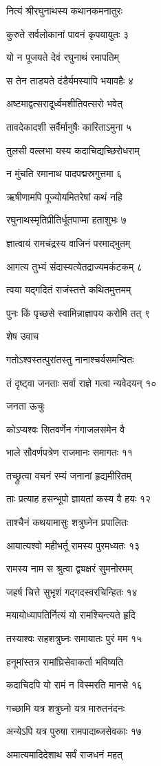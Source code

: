 नित्यं श्रीरघुनाथस्य कथानकमनातुरः

कुरुते सर्वलोकानां पावनं कृपयायुतः ३

यो न पूजयते देवं रघुनाथं रमापतिम्

स तेन ताड्यते दंडैर्यमस्यापि भयावहैः ४

अष्टमाद्वत्सरादूर्ध्वमशीतिवत्सरो भवेत्

तावदेकादशी सर्वैर्मानुषैः कारिताऽमुना ५

तुलसी वल्लभा यस्य कदाचिद्यच्छिरोधराम्

न मुंचति रमानाथ पादपद्मस्रगुत्तमा ६

ऋषीणामपि पूज्योयमितरेषां कथं नहि

रघुनाथस्मृतिप्रीतिर्धूतपाप्मा हताशुभः ७

ज्ञात्वायं रामचंद्रस्य वाजिनं परमाद्भुतम्

आगत्य तुभ्यं संदास्यत्येतद्राज्यमकंटकम् ८

त्वया यद्गदितं राजंस्तत्ते कथितमुत्तमम्

पुनः किं पृच्छसे स्वामिन्नाज्ञापय करोमि तत् ९

शेष उवाच

गतोऽश्वस्तत्पुरांतस्तु नानाश्चर्यसमन्वितः

तं दृष्ट्वा जनताः सर्वा राज्ञे गत्वा न्यवेदयन् १०

जनता ऊचुः

कोऽप्यश्वः सितवर्णेन गंगाजलसमेन वै

भाले सौवर्णपत्रेण राजमानः समागतः ११

तच्छ्रुत्वा वचनं रम्यं जनानां हृद्यमीरितम्

ताः प्रत्याह हसन्भूपो ज्ञायतां कस्य वै हयः १२

ताश्चैनं कथयामासुः शत्रुघ्नेन प्रपालितः

आयात्यश्वो महीभर्तू रामस्य पुरमध्यतः १३

रामस्य नाम स श्रुत्वा द्व्यक्षरं सुमनोरमम्

जहर्ष चित्ते सुभृशं गद्गदस्वरचिन्हितः १४

मयायोध्यापतिर्नित्यं यो रामश्चिन्त्यते हृदि

तस्याश्वः सहशत्रुघ्नः समायातः पुरं मम १५

हनूमांस्तत्र रामांघ्रिसेवाकर्ता भविष्यति

कदाचिदपि यो रामं न विस्मरति मानसे १६

गच्छामि यत्र शत्रुघ्नो यत्र मारुतनंदनः

अन्येऽपि यत्र पुरुषा रामपादाब्जसेवकाः १७

अमात्यमादिदेशाथ सर्वं राजधनं महत्

